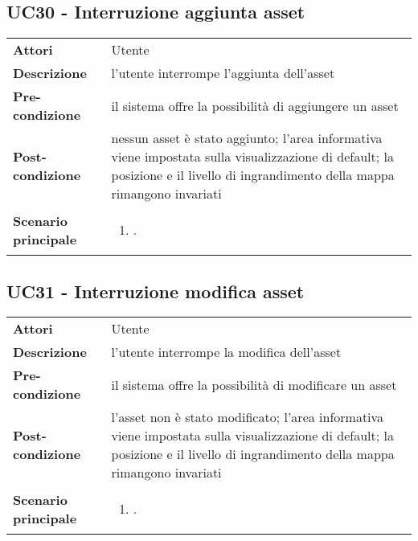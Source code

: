 \subsection{UC30 - Interruzione aggiunta asset} 
\label{sssec:UC30} 
\def\arraystretch{1.5}
\begin{tabularx}{\textwidth}{l|p{}}
	\rowcolor{I} \multicolumn{2}{c}{\color{white}\textbf{UC30 - Interruzione aggiunta asset}} \\
	\toprule
	\endhead
	\textbf{Attori} & Utente\\
	\textbf{Descrizione} & l'utente interrompe l'aggiunta dell'asset\\
	\textbf{Pre-condizione} & il sistema offre la possibilità di aggiungere un asset\\
	\textbf{Post-condizione} & nessun asset è stato aggiunto; l'area informativa viene impostata sulla visualizzazione di default; la posizione e il livello di ingrandimento della mappa rimangono invariati\\
	\textbf{Scenario principale} & \vspace{-1.2em}\begin{enumerate}[leftmargin=*,noitemsep,nosep]
		\item \nameref{sssec:UC30}.
	\end{enumerate}\\
	\bottomrule
\end{tabularx}
\subsection{UC31 - Interruzione modifica asset} 
\label{sssec:UC31} 
\def\arraystretch{1.5}
\begin{tabularx}{\textwidth}{l|p{}}
	\rowcolor{I} \multicolumn{2}{c}{\color{white}\textbf{UC31 - Interruzione modifica asset}} \\
	\toprule
	\endhead
	\textbf{Attori} & Utente\\
	\textbf{Descrizione} & l'utente interrompe la modifica dell'asset\\
	\textbf{Pre-condizione} & il sistema offre la possibilità di modificare un asset\\
	\textbf{Post-condizione} & l'asset non è stato modificato; l'area informativa viene impostata sulla visualizzazione di default; la posizione e il livello di ingrandimento della mappa rimangono invariati\\
	\textbf{Scenario principale} & \vspace{-1.2em}\begin{enumerate}[leftmargin=*,noitemsep,nosep]
		\item \nameref{sssec:UC31}.
	\end{enumerate}\\
	\bottomrule
\end{tabularx}
